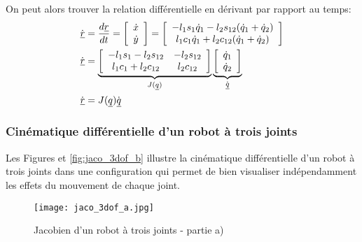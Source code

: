 On peut alors trouver la relation différentielle en dérivant par rapport au temps:
\begin{align}
	\dot{\underline{r}} &= \frac{d\underline{r}}{dt} = \left[ \begin{array}{c} \dot{x} \\ \dot{y}  \end{array} \right]  = \left[ \begin{array}{c}
																														 -l_1 s_1 \dot{q}_1 - l_2 s_{12}( \dot{q}_1 + \dot{q}_2 ) \\
																														 l_1 c_1 \dot{q}_1 + l_2 c_{12}( \dot{q}_1 + \dot{q}_2 )
	\end{array} \right] \\
	\dot{\underline{r}}  &=
	\underbrace{ \left[ \begin{array}{c c }
							-l_1 s_1 - l_2 s_{12} & - l_2 s_{12} \\
							l_1 c_1 + l_2 c_{12} &   l_2 c_{12}
	\end{array} \right]  }_{ J(\underline{q}) }
	\underbrace{ \left[ \begin{array}{c}
							\dot{q}_1 \\
							\dot{q}_2
	\end{array} \right]}_{ \dot{\underline{q}} } \\
	\dot{\underline{r}}  &= J(\underline{q}) \dot{\underline{q}}
\end{align}



\newpage
\subsubsection{Cinématique différentielle d'un robot à trois joints}
\label{sec:diffkinrobot3dofex}

Les Figures \pageref{fig:jaco_3dof_a} et \ref{fig:jaco_3dof_b} illustre la cinématique différentielle d'un robot à trois joints dans une configuration qui permet de bien visualiser indépendamment les effets du mouvement de chaque joint.

\begin{figure}[H]
	\centering
	\texttt{[image: jaco\_3dof\_a.jpg]}
	\caption{Jacobien d'un robot à trois joints - partie a)}
	\label{fig:jaco_3dof_a}
\end{figure}

